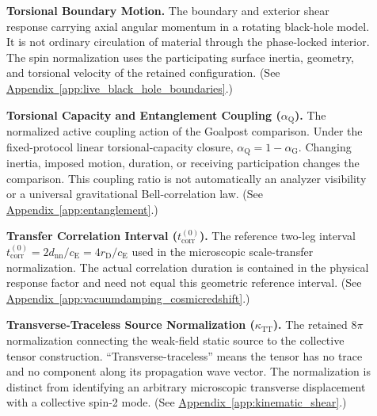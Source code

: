 \begin{description}
\item[] \begin{minipage}[t]{\linewidth}
\textbf{Torsional Boundary Motion.} The boundary and exterior shear response carrying axial angular momentum in a rotating black-hole model. It is not ordinary circulation of material through the phase-locked interior. The spin normalization uses the participating surface inertia, geometry, and torsional velocity of the retained configuration.
(See \hyperref[app:live_black_hole_boundaries]{Appendix~\ref*{app:live_black_hole_boundaries}}.)
\end{minipage}

\item[] \begin{minipage}[t]{\linewidth}
\textbf{Torsional Capacity and Entanglement Coupling ($\alpha_{\mathrm Q}$).} The normalized active coupling action of the Goalpost comparison. Under the fixed-protocol linear torsional-capacity closure, $\alpha_{\mathrm Q}=1-\alpha_{\mathrm G}$. Changing inertia, imposed motion, duration, or receiving participation changes the comparison. This coupling ratio is not automatically an analyzer visibility or a universal gravitational Bell-correlation law.
(See \hyperref[app:entanglement]{Appendix~\ref*{app:entanglement}}.)
\end{minipage}

\item[] \begin{minipage}[t]{\linewidth}
\textbf{Transfer Correlation Interval ($t_{\mathrm{corr}}^{(0)}$).} The reference two-leg interval $t_{\mathrm{corr}}^{(0)}=2d_{\mathrm{nn}}/c_{\mathrm E}=4r_{\mathrm D}/c_{\mathrm E}$ used in the microscopic scale-transfer normalization. The actual correlation duration is contained in the physical response factor and need not equal this geometric reference interval.
(See \hyperref[app:vacuumdamping_cosmicredshift]{Appendix~\ref*{app:vacuumdamping_cosmicredshift}}.)
\end{minipage}

\item[] \begin{minipage}[t]{\linewidth}
\textbf{Transverse-Traceless Source Normalization ($\kappa_{\mathrm{TT}}$).} The retained $8\pi$ normalization connecting the weak-field static source to the collective tensor construction. ``Transverse-traceless'' means the tensor has no trace and no component along its propagation wave vector. The normalization is distinct from identifying an arbitrary microscopic transverse displacement with a collective spin-2 mode.
(See \hyperref[app:kinematic_shear]{Appendix~\ref*{app:kinematic_shear}}.)
\end{minipage}


\end{description}
